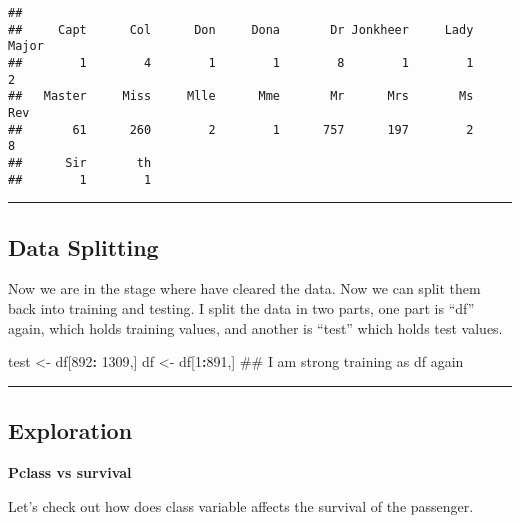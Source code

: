\documentclass[]{article}
\newenvironment{Shaded}{\begin{snugshade}}{\end{snugshade}}
\newcommand{\KeywordTok}[1]{\textcolor[rgb]{0.13,0.29,0.53}{\textbf{#1}}}
\newcommand{\DataTypeTok}[1]{\textcolor[rgb]{0.13,0.29,0.53}{#1}}
\newcommand{\DecValTok}[1]{\textcolor[rgb]{0.00,0.00,0.81}{#1}}
\newcommand{\StringTok}[1]{\textcolor[rgb]{0.31,0.60,0.02}{#1}}
\newcommand{\OperatorTok}[1]{\textcolor[rgb]{0.81,0.36,0.00}{\textbf{#1}}}
\newcommand{\NormalTok}[1]{#1}
\begin{document}
\begin{verbatim}
## 
##     Capt      Col      Don     Dona       Dr Jonkheer     Lady    Major 
##        1        4        1        1        8        1        1        2 
##   Master     Miss     Mlle      Mme       Mr      Mrs       Ms      Rev 
##       61      260        2        1      757      197        2        8 
##      Sir       th 
##        1        1
\end{verbatim}

\begin{center}\rule{0.5\linewidth}{\linethickness}\end{center}

\subsection{Data Splitting}\label{data-splitting}

Now we are in the stage where have cleared the data. Now we can split
them back into training and testing. I split the data in two parts, one
part is ``df'' again, which holds training values, and another is
``test'' which holds test values.

\begin{Shaded}
\begin{Highlighting}[]
\NormalTok{test <-}\StringTok{ }\NormalTok{df[}\DecValTok{892}\OperatorTok{:}\StringTok{ }\DecValTok{1309}\NormalTok{,]}
\NormalTok{df <-}\StringTok{ }\NormalTok{df[}\DecValTok{1}\OperatorTok{:}\DecValTok{891}\NormalTok{,] ## I am strong training as df again}
\end{Highlighting}
\end{Shaded}

\begin{center}\rule{0.5\linewidth}{\linethickness}\end{center}

\subsection{Exploration}\label{exploration}

\textbf{Pclass vs survival}

Let's check out how does class variable affects the survival of the
passenger.

\begin{Shaded}
\end{Shaded}
\end{document}

